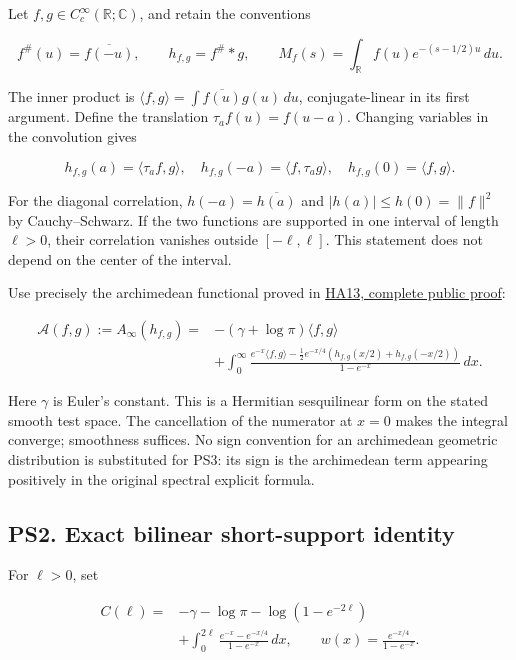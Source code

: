 \documentclass[
  10pt,
  a4paper,
]{article}
\begin{document}
Let \(f,g\in C_c^\infty(\mathbb R;\mathbb C)\), and retain the
conventions

\[
f^\#(u)=\overline{f(-u)},\qquad
h_{f,g}=f^\#*g,\qquad
M_f(s)=\int_{\mathbb R}f(u)e^{-(s-1/2)u}\,du.
\tag{PS1}
\]

The inner product is \(\langle f,g\rangle=\int\overline{f(u)}g(u)\,du\),
conjugate-linear in its first argument. Define the translation
\(\tau_a f(u)=f(u-a)\). Changing variables in the convolution gives

\[
h_{f,g}(a)=\langle\tau_a f,g\rangle,
\quad h_{f,g}(-a)=\langle f,\tau_a g\rangle,
\quad h_{f,g}(0)=\langle f,g\rangle.
\tag{PS2}
\]

For the diagonal correlation, \(h(-a)=\overline{h(a)}\) and
\(|h(a)|\le h(0)=\|f\|^2\) by Cauchy--Schwarz. If the two functions are
supported in one interval of length \(\ell>0\), their correlation
vanishes outside \([-\ell,\ell]\). This statement does not depend on the
center of the interval.

Use precisely the archimedean functional proved in
\href{https://github.com/KokunoYumeto/zeta-function-research-reader/blob/76f421965914beb133df797835f940849844dc4f/workbenches/splitzero-tandem/branches/tau-zero-prime-positivity/HEAT_CAUCHY_ARITHMETIC_DERIVATION.md}{HA13,
complete public proof}:

\[
\begin{aligned}
\mathcal A(f,g):=A_\infty(h_{f,g})
={}&-(\gamma+\log\pi)\langle f,g\rangle\\
&+\int_0^\infty
\frac{e^{-x}\langle f,g\rangle
-\tfrac12e^{-x/4}(h_{f,g}(x/2)+h_{f,g}(-x/2))}
{1-e^{-x}}\,dx.
\end{aligned}
\tag{PS3}
\]

Here \(\gamma\) is Euler's constant. This is a Hermitian sesquilinear
form on the stated smooth test space. The cancellation of the numerator
at \(x=0\) makes the integral converge; smoothness suffices. No sign
convention for an archimedean geometric distribution is substituted for
PS3: its sign is the archimedean term appearing positively in the
original spectral explicit formula.

\subsection{PS2. Exact bilinear short-support
identity}\label{ps2.-exact-bilinear-short-support-identity}

For \(\ell>0\), set

\[
\begin{aligned}
C(\ell)={}&-\gamma-\log\pi
-\log(1-e^{-2\ell})\\
&+\int_0^{2\ell}\frac{e^{-x}-e^{-x/4}}{1-e^{-x}}\,dx,
\qquad
w(x)=\frac{e^{-x/4}}{1-e^{-x}}.
\end{aligned}
\tag{PS4}
\]
\end{document}
